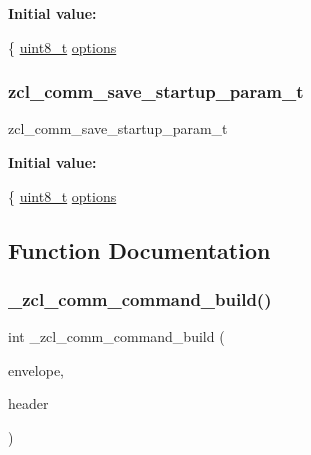 {\bfseries Initial value\+:}
\begin{DoxyCode}
\{
   \hyperlink{group__hal__dos_gae1affc9ca37cfb624959c866a73f83c2}{uint8\_t}    \hyperlink{group__xbee__atcmd_gaace3d640c8d449b8db1162993d259d3f}{options}
\end{DoxyCode}
\mbox{\label{group__zcl__commissioning_ga54948835520b59b78317db2829ffd078}} 
\subsubsection{\texorpdfstring{zcl\+\_\+comm\+\_\+save\+\_\+startup\+\_\+param\+\_\+t}{zcl\_comm\_save\_startup\_param\_t}}
{\footnotesize\ttfamily zcl\+\_\+comm\+\_\+save\+\_\+startup\+\_\+param\+\_\+t}

{\bfseries Initial value\+:}
\begin{DoxyCode}
\{
   \hyperlink{group__hal__dos_gae1affc9ca37cfb624959c866a73f83c2}{uint8\_t}    \hyperlink{group__xbee__atcmd_gaace3d640c8d449b8db1162993d259d3f}{options}
\end{DoxyCode}


\subsection{Function Documentation}
\mbox{\label{group__zcl__commissioning_ga0eeed24c2ca26aa030876addc4caf67d}} 
\subsubsection{\texorpdfstring{\+\_\+zcl\+\_\+comm\+\_\+command\+\_\+build()}{\_zcl\_comm\_command\_build()}}
{\footnotesize\ttfamily int \+\_\+zcl\+\_\+comm\+\_\+command\+\_\+build (\begin{DoxyParamCaption}\item[{\hyperlink{structwpan__envelope__t}{wpan\+\_\+envelope\+\_\+t} \hyperlink{group__hal_gaef060b3456fdcc093a7210a762d5f2ed}{F\+AR} $\ast$}]{envelope,  }\item[{\hyperlink{group__zcl_gae988eb59c8a2e75b6cb34aefeca315d1}{zcl\+\_\+header\+\_\+nomfg\+\_\+t} $\ast$}]{header }\end{DoxyParamCaption})}



